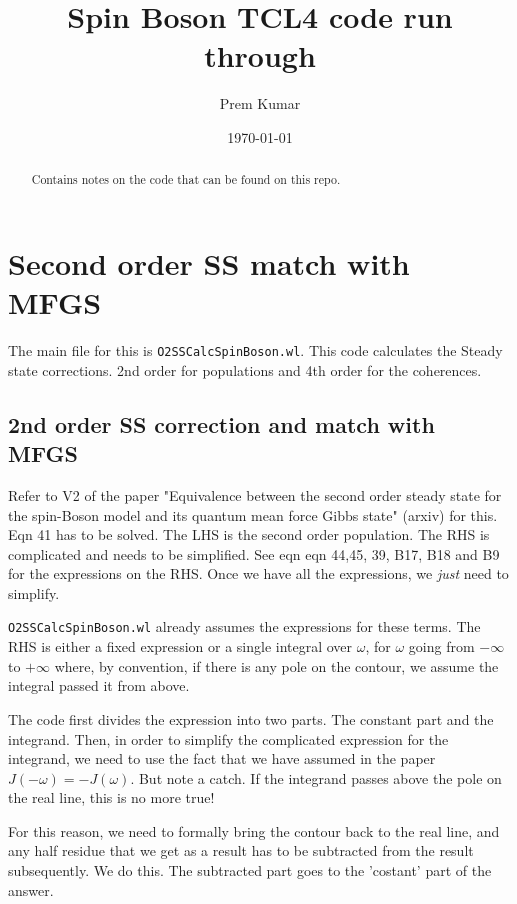 \documentclass[11pt]{article}
\title{Spin Boson TCL4 code run through}
\author{Prem Kumar}
\date{\today}
\begin{document}
\maketitle

\begin{abstract}
Contains notes on the code that can be found on this repo.
\end{abstract}

\section{Second order SS match with MFGS}

The main file for this is \verb|O2SSCalcSpinBoson.wl|. This code calculates the Steady state corrections. 2nd order for populations and 4th order for the coherences.

\subsection{2nd order SS correction and match with MFGS}

Refer to V2 of the paper "Equivalence between the second order steady state for the spin-Boson model and its quantum mean force Gibbs state" (arxiv) for this. Eqn 41 has to be solved. The LHS is the second order population. The RHS is complicated and needs to be simplified. See eqn eqn 44,45, 39, B17, B18 and B9 for the expressions on the RHS. Once we have all the expressions, we \textit{just} need to simplify.

\verb|O2SSCalcSpinBoson.wl| already assumes the expressions for these terms. The RHS is either a fixed expression or a single integral over $\omega$, for $\omega$ going from $-\infty$ to $+\infty$ where, by convention, if there is any pole on the contour, we assume the integral passed it from above.

The code first divides the expression into two parts. The constant part and the integrand. Then, in order to simplify the complicated expression for the integrand, we need to use the fact that we have assumed in the paper $J(-\omega) = -J(\omega)$. But note a catch. If the integrand passes above the pole on the real line, this is no more true!

For this reason, we need to formally bring the contour back to the real line, and any half residue that we get as a result has to be subtracted from the result subsequently. We do this. The subtracted part goes to the 'costant' part of the answer.
\end{document}
